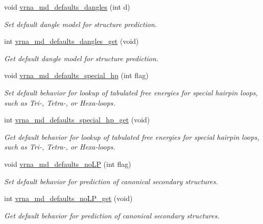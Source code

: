 \begin{DoxyCompactItemize}
void \mbox{\hyperlink{group__model__details_gac76a5374def8e5e4e644ff6e4cc72dee}{vrna\+\_\+md\+\_\+defaults\+\_\+dangles}} (int d)
\begin{DoxyCompactList}\small\item\em Set default dangle model for structure prediction. \end{DoxyCompactList}\item 
int \mbox{\hyperlink{group__model__details_ga67ca06f95ae133778c79a4493c9817b8}{vrna\+\_\+md\+\_\+defaults\+\_\+dangles\+\_\+get}} (void)
\begin{DoxyCompactList}\small\item\em Get default dangle model for structure prediction. \end{DoxyCompactList}\item 
void \mbox{\hyperlink{group__model__details_gafff6449a02744add0308e653230c15fc}{vrna\+\_\+md\+\_\+defaults\+\_\+special\+\_\+hp}} (int flag)
\begin{DoxyCompactList}\small\item\em Set default behavior for lookup of tabulated free energies for special hairpin loops, such as Tri-\/, Tetra-\/, or Hexa-\/loops. \end{DoxyCompactList}\item 
int \mbox{\hyperlink{group__model__details_ga1d68a6efdaa1253cc63fd9cd06452559}{vrna\+\_\+md\+\_\+defaults\+\_\+special\+\_\+hp\+\_\+get}} (void)
\begin{DoxyCompactList}\small\item\em Get default behavior for lookup of tabulated free energies for special hairpin loops, such as Tri-\/, Tetra-\/, or Hexa-\/loops. \end{DoxyCompactList}\item 
void \mbox{\hyperlink{group__model__details_ga2f88ffc393ac9d7987849c965fd29ea8}{vrna\+\_\+md\+\_\+defaults\+\_\+no\+LP}} (int flag)
\begin{DoxyCompactList}\small\item\em Set default behavior for prediction of canonical secondary structures. \end{DoxyCompactList}\item 
int \mbox{\hyperlink{group__model__details_ga934344888fbacaed538bbbfe910f2aa6}{vrna\+\_\+md\+\_\+defaults\+\_\+no\+L\+P\+\_\+get}} (void)
\begin{DoxyCompactList}\small\item\em Get default behavior for prediction of canonical secondary structures. \end{DoxyCompactList}\item 

\end{DoxyCompactItemize}
